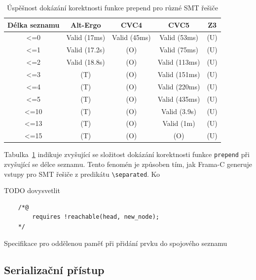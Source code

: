 \begin{table}[H]
    \centering
    \begin{tabular}{|c|c|c|c|c|}
        \hline
        Délka seznamu & Alt-Ergo & CVC4 & CVC5 & Z3 \\
        \hline
        <=0  & Valid (17ms)  & Valid (45ms) & Valid (53ms)  & (U) \\
        <=1  & Valid (17.2s) & (O)          & Valid (75ms)  & (U) \\
        <=2  & Valid (18.8s) & (O)          & Valid (113ms) & (U) \\
        <=3  & (T)           & (O)          & Valid (151ms) & (U) \\
        <=4  & (T)           & (O)          & Valid (220ms) & (U) \\
        <=5  & (T)           & (O)          & Valid (435ms) & (U) \\
        <=10 & (T)           & (O)          & Valid (3.9s)  & (U) \\
        <=13 & (T)           & (O)          & Valid (1m)    & (U) \\
        <=15 & (T)           & (O)          & (O)           & (U) \\
        \hline
    \end{tabular}
    \caption{Úspěšnost dokázání korektnosti funkce prepend pro různé SMT řešiče}
    \label{tab:prepend-smt-success}
\end{table}

Tabulka~\ref{tab:prepend-smt-success} indikuje zvyšující se složitost dokázání korektnosti funkce \texttt{prepend}
při zvyšující se délce seznamu.
Tento fenomén je způsoben tím, jak Frama\mbox{-}C generuje vstupy pro SMT řešiče z predikátu \texttt{\textbackslash separated}.
Ko

TODO dovysvetlit


\begin{listing}[H]
    \begin{verbatim}
    /*@
        requires !reachable(head, new_node);
    */
    \end{verbatim}
    \caption{Specifikace pro oddělenou paměť při přidání prvku do spojového seznamu}
    \label{list:linked-list-axiom-prepend}
\end{listing}


\subsection{Serializační přístup}
\label{subsec:serializacni-pristup}

